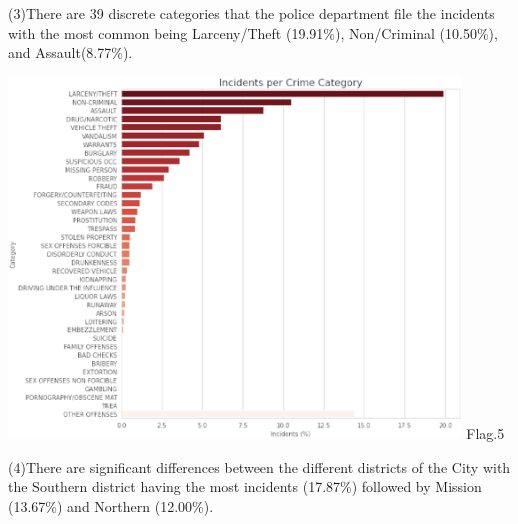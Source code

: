 (3)There are 39 discrete categories that the police department file the incidents with the 
most common being Larceny/Theft (19.91\%), Non/Criminal (10.50\%),
 and Assault(8.77\%).
\begin{center}
  \begin{minipage}{0.4\linewidth}
  \centering
  \includegraphics[width=0.9\textwidth]{kaggle/9.eps}
  {\small{Flag.5}}

  \end{minipage}
  \hfill
\end{center}
(4)There are significant differences between the different districts of the City with
the Southern district having the most incidents (17.87\%) followed
by Mission (13.67\%) and Northern (12.00\%).

